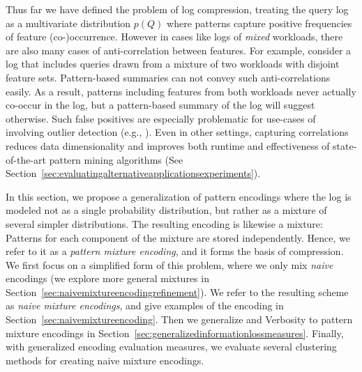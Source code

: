 \label{sec:patternmixtureencodings}
Thus far we have defined the problem of log compression, treating the query log as a multivariate distribution $p(Q)$ where patterns capture positive frequencies of feature (co-)occurrence.
However in cases like logs of \textit{mixed} workloads, there are also many cases of anti-correlation between features.
For example, consider a log that includes queries drawn from a mixture of two workloads with disjoint feature sets.
Pattern-based summaries can not convey such anti-correlations easily.
As a result, patterns including features from both workloads never actually co-occur in the log, but a pattern-based summary of the log will suggest otherwise.
Such false positives are especially problematic for use-cases of \systemname involving outlier detection (e.g., \cite{DBLP:conf/trustcom/KulUC18}).
Even in other settings, capturing correlations reduces data dimensionality and improves both runtime and effectiveness of state-of-the-art pattern mining algorithms (See Section~\ref{sec:evaluatingalternativeapplicationsexperiments}).

In this section, we propose a generalization of pattern encodings where the log is modeled not as a single probability distribution, but rather as a mixture of several simpler distributions.
The resulting encoding is likewise a mixture: Patterns for each component of the mixture are stored independently.
Hence, we refer to it as a \emph{pattern mixture encoding}, and it forms the basis of \systemname compression.
We first focus on a simplified form of this problem, where we only mix \emph{naive} encodings (we explore more general mixtures in Section~\ref{sec:naivemixtureencodingrefinement}).
We refer to the resulting scheme as \textit{naive mixture encodings}, and give examples of the encoding in Section~\ref{sec:naivemixtureencoding}.
Then we generalize \errorname and Verbosity to pattern mixture encodings in Section~\ref{sec:generalizedinformationlossmeasures}.
Finally, with generalized encoding evaluation measures, we evaluate several clustering methods for creating naive mixture encodings.

